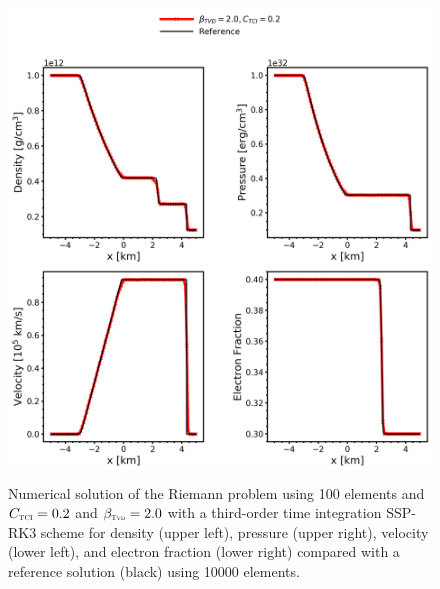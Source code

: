 \documentclass[onecolumn]{aastex62}
\newcommand{\TVD}{\textnormal{\tiny\textsc{Tvd}}}
\newcommand{\TCI}{\textnormal{\tiny\textsc{TCI}}}
\begin{document}
\begin{figure}[h!]
  \centering
  \includegraphics[width=32pc,height=30pc]{optimal.png}
  \centering
  \caption{\label{fig:SodSedovOptimal} Numerical solution of the Riemann problem using
    100 elements and $C_{\TCI} = 0.2$ and $\beta_{\TVD} = 2.0$ with a third-order
    time integration SSP-RK3 scheme for density (upper left), pressure (upper right),
    velocity (lower left), and electron fraction (lower right)
    compared with a reference solution (black) using 10000 elements.}
\end{figure}
\end{document}
